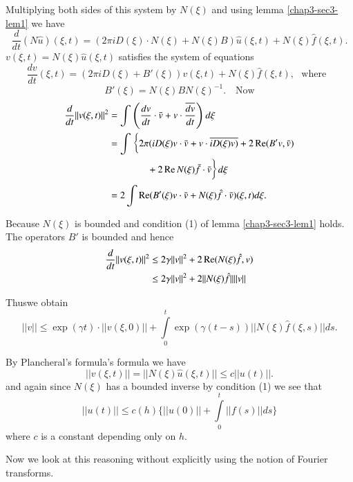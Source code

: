  Multiplying both sides of this system by $N(\xi)$ and using
 lemma \ref{chap3-sec3-lem1} we have  
 $$
 \frac{d}{dt} (N\hat{u}) (\xi,t) = (2 \pi i D (\xi) \cdot N (\xi) + N (\xi) 
 B) \hat{u} (\xi,t) + N (\xi) \hat{f} (\xi, t). 
 $$
 $v (\xi, t) = N (\xi) \hat{u} (\xi, t)$ satisfies the system of
 equations 
 \begin{equation}
\frac{dv}{dt} (\xi, t) = (2 \pi i D (\xi) + B' (\xi)) v (\xi,t) + N
(\xi) \hat{f} (\xi, t ), \text{~ where~ } \tag{3.3} \label{chap3-eq3.3}
 \end{equation}
 $$
 B' (\xi) = N (\xi) BN (\xi)^{-1}.\quad \text{Now}  
 $$
 \begin{align*}
\frac{d}{dt} || v (\xi, t)||^2 & = \int \left( \frac{dv}{dt} \cdot  \bar{v}
+ v \cdot \frac{\overline{dv}}{dt} \right) d\xi\\ 
& = \int \bigg\{ 2 \pi ( i D (\xi ) v \cdot  \bar{v}+ v \cdot
\overline{iD (\xi ) v)} + 2 \operatorname{Re} (B' v,\bar{v}) \\
& \qquad \qquad + 2 \operatorname{Re} N(\xi )
\bar{f} \cdot \bar{v}\bigg\}d \xi \\ 
& = 2 \int \operatorname{Re} (B' (\xi ) v \cdot \bar{v} + N (\xi ) \hat{f}
\cdot\bar{v}) (\xi,t) d \xi.  
 \end{align*} 

 Because $N(\xi)$ is bounded and condition (1) of lemma
 \ref{chap3-sec3-lem1} holds. The operators $B'$ is bounded and 
 hence  
 \begin{align*}
\frac{d}{dt} || v (\xi, t)||^2  & \leq 2 \gamma || v || ^2 + 2 \operatorname{Re}
(N(\xi ) \hat{f}, v)\\ 
& \leq 2 \gamma || v ||^2 + 2 || N(\xi ) \hat{f} || || v || 
 \end{align*}

 Thus\pageoriginale we obtain
 $$
 || v || \leq \exp (\gamma t) \cdot  || v (\xi, 0)|| + \int\limits^{t}_{0}
 \exp (\gamma (t-s)) || N (\xi) \hat{f} (\xi, s)|| ds. 
 $$ 

 By Plancheral's formula's formula we have    
 $$
 || v (\xi, t) || = || N (\xi) \hat{u} (\xi, t) || \leq c ||u  (t)
 ||. 
 $$
 and again since $N(\xi)$ has a bounded inverse by condition (1) we
 see that  
 \begin{equation}
 || u(t)|| \leq c(h) \bigg\{ || u (0) || + \int\limits^{t}_{0} || f
 (s) || ds \bigg\} \tag{3.4} \label{chap3-eq3.4}
 \end{equation}
 where $c$ is a constant depending only on $h$. 
 
 Now we look at this reasoning without explicitly using the notion of
 Fourier transforms. 
 
